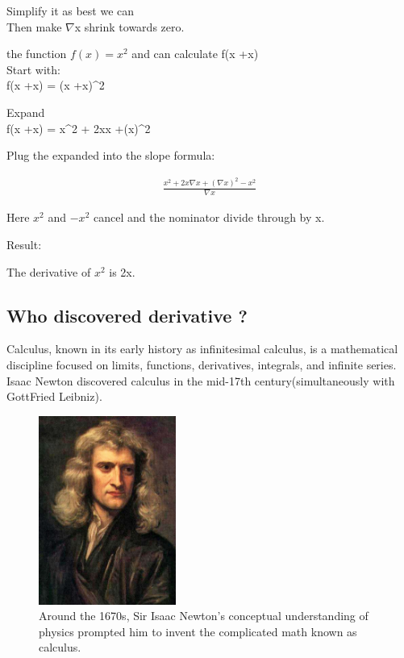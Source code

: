 \documentclass[aps,pra,notitlepage,amsmath,amssymb,letterpaper,12pt]{revtex4-1}
\newenvironment{problem}[2][Problem]{\begin{trivlist}
\item[\hskip \labelsep {\bfseries #1}\hskip \labelsep {\bfseries #2.}]}{\end{trivlist}}
\begin{document}
Simplify it as best we can\\
Then make $\nabla$x shrink towards zero.\\
\begin{problem}{1}
the function $f(x) = x^2$ and can calculate f(x +\nabla x)\\

Start with:\\
f(x +\nabla x) = (x +\nabla x)^2

Expand\\
f(x +\nabla x) = x^2 + 2x\nabla x +(\nabla x)^2

Plug the expanded into the slope formula:

\begin{align}
\frac{x^2 + 2x\nabla x +(\nabla x)^2 - x^2}{\nabla x} 
\end{align}

Here $x^2$ and $-x^2$ cancel and the nominator divide through by \nabla x.

Result:

The derivative of $x^2$ is 2x.

\subsection{Who discovered derivative ?} %

Calculus, known in its early history as infinitesimal calculus, is a mathematical discipline focused on limits, functions, derivatives, integrals, and infinite series. Isaac Newton discovered calculus in the mid-17th century(simultaneously with GottFried Leibniz).

\begin{figure}[h!] %
  \includegraphics[width=0.4\textwidth]
  {GodfreyKneller-IsaacNewton-1689.jpg}  %
  \caption{Around the 1670s, Sir Isaac Newton's conceptual understanding of physics prompted him to invent the complicated math known as calculus.}
  \label{fig:figlabel}
\end{figure}

\end{problem}
\end{document}
